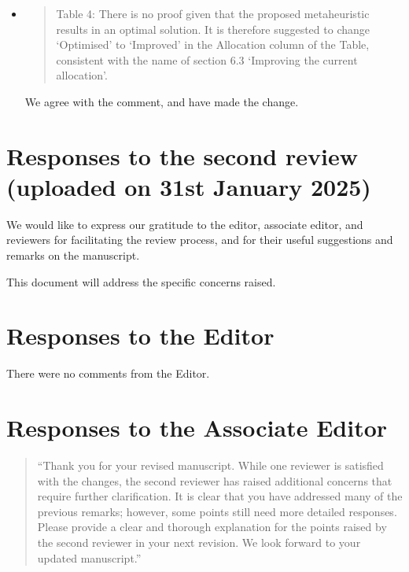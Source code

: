 \documentclass{article}
\begin{document}
\begin{itemize}
  \item
  \begin{quote}
  Table 4: There is no proof given that the proposed metaheuristic results in an optimal solution. It is therefore suggested to change ‘Optimised’ to ‘Improved’ in the Allocation column of the Table, consistent with the name of section 6.3 ‘Improving the current allocation’.
  \end{quote}

  We agree with the comment, and have made the change.

  \end{itemize}
















\newpage


\section{Responses to the second review\\(uploaded on 31st January 2025) }



We would like to express our gratitude to the editor, associate editor, and reviewers for facilitating the review process, and for their useful suggestions and remarks on the manuscript.

This document will address the specific concerns raised.

\section{Responses to the Editor}


There were no comments from the Editor.



\section{Responses to the Associate Editor}
\begin{quote}
``Thank you for your revised manuscript. While one reviewer is satisfied with
    the changes, the second reviewer has raised additional concerns that require
    further clarification. It is clear that you have addressed many of the
    previous remarks; however, some points still need more detailed responses.
    Please provide a clear and thorough explanation for the points raised by the
    second reviewer in your next revision. We look forward to your updated
    manuscript.''
\end{quote}
\end{document}
